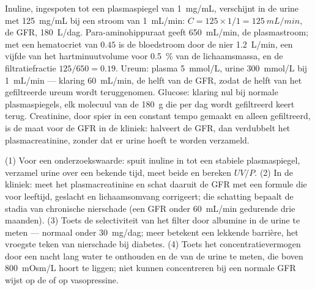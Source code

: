\begin{example}\label{ex:b3:renal-osmoregulation:numbers}
Inuline, ingespoten tot een plasmaspiegel van \qty{1}{mg/mL},
verschijnt in de urine met \qty{125}{mg/mL} bij een stroom van
\qty{1}{mL/min}: $C = 125\times 1/1 =
\qty{125}{mL/min}$, de GFR, \qty{180}{L/dag}. Para-aminohippuraat geeft
\qty{650}{mL/min}, de plasmastroom; met een hematocriet van $0.45$ is
de bloedstroom door de nier \qty{1.2}{L/min}, een vijfde van het
hartminuutvolume voor \qty{0.5}{\%} van de lichaamsmassa, en de
filtratiefractie $125/650 = 0.19$. Ureum: plasma \qty{5}{mmol/L}, urine
\qty{300}{mmol/L} bij \qty{1}{mL/min} --- klaring \qty{60}{mL/min}, de
helft van de GFR, zodat de helft van het gefiltreerde ureum wordt
teruggenomen. Glucose: klaring nul bij normale plasmaspiegels, elk
molecuul van de \qty{180}{g} die per dag wordt gefiltreerd keert terug.
Creatinine, door spier in een constant tempo gemaakt en alleen
gefiltreerd, is de maat voor de GFR in de kliniek: halveert de GFR, dan
verdubbelt het plasmacreatinine, zonder dat er urine hoeft te worden
verzameld.
\end{example}

\begin{method}\label{met:b3:renal-osmoregulation:gfr}
(1) Voor een onderzoekswaarde: spuit inuline in tot een stabiele
plasmaspiegel, verzamel urine over een bekende tijd, meet beide en
bereken $UV/P$. (2) In de kliniek: meet het plasmacreatinine en schat
daaruit de GFR met een formule die voor leeftijd, geslacht en
lichaamsomvang corrigeert; die schatting bepaalt de stadia van
chronische nierschade (een GFR onder \qty{60}{mL/min} gedurende drie
maanden). (3) Toets de selectiviteit van het filter door albumine in de
urine te meten --- normaal onder \qty{30}{mg/dag}; meer betekent een
lekkende barrière, het vroegste teken van nierschade bij diabetes.
(4) Toets het concentratievermogen door een nacht lang water te
onthouden en de  van de urine te meten, die boven
\qty{800}{mOsm/L} hoort te liggen; niet kunnen concentreren bij een
normale GFR wijst op de  of op vasopressine.
\end{method}

